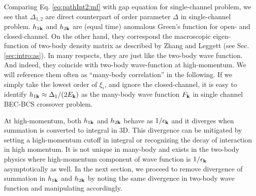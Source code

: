 Comparing Eq. \ref{eq:pathInt2:mf} with gap equation for single-channel problem, we  see that $\Delta_{1,2}$ are  direct counterpart of order parameter $\Delta$ in single-channel problem. 
$h_{1\mathbf{k}}$ and $h_{2\mathbf{k}}$ are (equal time) anomalous Green's function for open- and closed-channel. On the other hand, they correspond the macroscopic eigen-function of two-body density matrix as described by Zhang and Leggett\cite{ZhangThesis,shizhongUniv} (see Sec. \ref{sec:intro:as}). In many respects, they are just like the two-body wave function. And indeed, they coincide with two-body wave-function at high-momentum.  We will reference them often as ``many-body correlation'' in the following.  
If we simply take the lowest order of $\xi_{i}$, and ignore the closed-channel, it is easy to identify $h_{1\mathbf{k}}\approx{\Delta_{1}}/(2E_{\mathbf{k}})$ as the many-body wave function $F_{\mathbf{k}}$ in single channel BEC-BCS crossover problem.  


At high-momentum, both $h_{1\mathbf{k}}$ and $h_{2\mathbf{k}}$ behave as $1/\epsilon_{\mathbf{k}}$ and it diverges when summation is converted to integral in 3D.  This divergence can be mitigated by setting a high-momentum cutoff in integral or recognizing the decay of interaction  in high momentum.  It is not unique in many-body and exists in the two-body physics where  high-momentum component of wave function is  $1/\epsilon_{\mathbf{k}}$ asymptotically as well.  In the next section, we proceed to  remove divergence of summation in $h_{1\mathbf{k}}$ and $h_{2\mathbf{k}}$ by noting the same divergence in two-body wave function and manipulating accordingly. 
 
